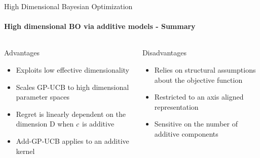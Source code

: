 

\begin{frame}[c]{High Dimensional Bayesian Optimization}
\framesubtitle{High dimensional BO via additive models - Summary}
\begin{columns}[T] %
\begin{column}{.48\textwidth}


    \begin{block}{Advantages}
    \begin{itemize}
    	\item Exploits low effective dimensionality
    	\item Scales GP-UCB to high dimensional parameter spaces
    	\item Regret is linearly dependent on the dimension D when $c$ is additive
    	\item Add-GP-UCB applies to an additive kernel
    \end{itemize}
    \end{block}
\pause
\end{column}%

\hfill%

\begin{column}{.48\textwidth}

    \begin{block}{Disadvantages}
    \begin{itemize}
    	\item Relies on structural assumptions about the objective function
    	\item Restricted to an axis aligned representation
    	\item Sensitive on the number of additive components
    \end{itemize}
\end{block}

\end{column}
\end{columns}   
\end{frame}

